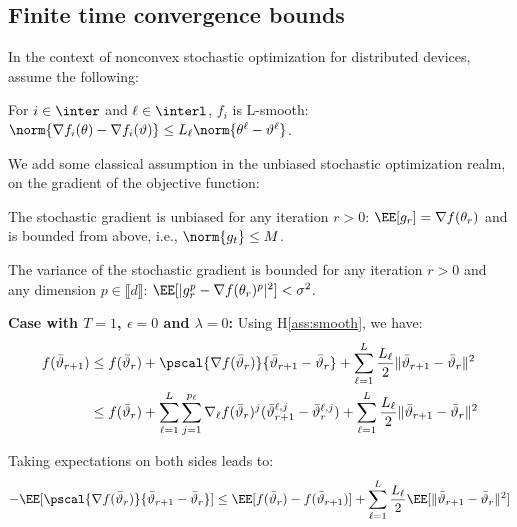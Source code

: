 \documentclass{article}
\begin{document}
\subsection{Finite time convergence bounds}

In the context of nonconvex stochastic optimization for distributed devices, assume the following:

\begin{assumption}\label{ass:smooth}
For $i \in \inter$ and $\ell \in \interl$, $f_i$ is  L-smooth: $\norm{\nabla f_i (\theta) - \nabla f_i (\vartheta)} \leq L_\ell \norm{\theta^\ell-\vartheta^\ell}$.
\end{assumption}
We add some classical assumption in the unbiased stochastic optimization realm, on the gradient of the objective function:
\begin{assumption}
The stochastic gradient is unbiased for any iteration $r>0$: $\EE[g_r] = \nabla f(\theta_r)$ and is bounded from above, i.e., $\norm{g_t} \leq M$.
\end{assumption}

\begin{assumption}
The variance of the stochastic gradient is bounded for any iteration $r>0$ and any dimension $p \in \llbracket d \rrbracket$: $\EE[|g_r^p - \nabla f(\theta_r)^p|^2] < \sigma^2$.
\end{assumption}


\textbf{Case with $T=1$, $\epsilon = 0$ and $\lambda = 0$:}
Using H\ref{ass:smooth}, we have:
\begin{align}\notag
f(\bar{\vartheta}_{r+1}) &  \leq f(\bar{\vartheta}_r) + \pscal{\nabla f(\bar{\vartheta}_r)}{\bar{\vartheta}_{r+1} - \bar{\vartheta}_r} + \sum_{\ell =1}^L \frac{L_\ell}{2} \| \bar{\vartheta}_{r+1} - \bar{\vartheta}_r \|^2\\
&  \leq f(\bar{\vartheta}_r) + \sum_{\ell=1}^L \sum_{j=1}^{p_\ell} \nabla_{\ell} f(\bar{\vartheta}_r)^j (\bar{\vartheta}^{\ell,j}_{r+1} - \bar{\vartheta}^{\ell,j}_r) + \sum_{\ell =1}^L \frac{L_\ell}{2} \| \bar{\vartheta}_{r+1} - \bar{\vartheta}_r \|^2
\end{align}

Taking expectations on both sides leads to:
\begin{align}\label{eq:main}
- \EE[  \pscal{\nabla f(\bar{\vartheta}_r)}{\bar{\vartheta}_{r+1} - \bar{\vartheta}_r}]  \leq  \EE[ f(\bar{\vartheta}_r) - f(\bar{\vartheta}_{r+1})] + \sum_{\ell =1}^L \frac{L_\ell}{2} \EE[  \| \bar{\vartheta}_{r+1} - \bar{\vartheta}_r \|^2]
\end{align}
\end{document}
